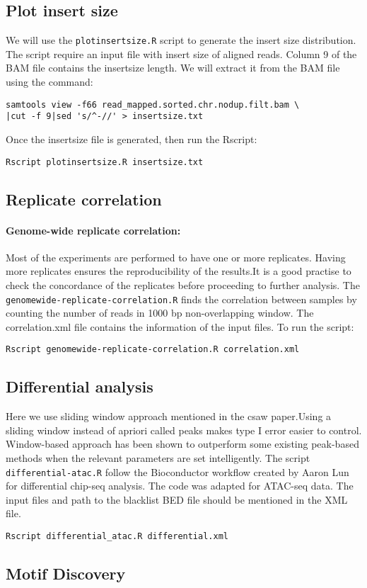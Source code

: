\documentclass[10pt]{article}
\newcommand{\prog}[1]{\texttt{#1}}
\begin{document}
\subsection{Plot insert size}
We will use the \prog{plotinsertsize.R} script to generate the insert size distribution. The script require an input file with insert size of aligned reads. Column 9 of the BAM file contains the insertsize length. We will extract it from the BAM file using the command:
\begin{verbatim}
samtools view -f66 read_mapped.sorted.chr.nodup.filt.bam \
|cut -f 9|sed 's/^-//' > insertsize.txt
\end{verbatim}
Once the insertsize file is generated, then run the Rscript:
\begin{verbatim}
Rscript plotinsertsize.R insertsize.txt
\end{verbatim}
\subsection{Replicate correlation}
\paragraph{Genome-wide replicate correlation:} Most of the experiments are performed to have one or more replicates. Having more replicates ensures the reproducibility of the results.It is a good practise to check the concordance of the replicates before proceeding to further analysis. The \prog{genomewide-replicate-correlation.R} finds the correlation between samples by counting the number of reads in 1000 bp non-overlapping window. The correlation.xml file contains the information of the input files. To run the script:
\begin{verbatim}
Rscript genomewide-replicate-correlation.R correlation.xml
\end{verbatim}
\subsection{Differential analysis}
Here we use sliding window approach mentioned in the csaw paper.Using a sliding window instead of apriori called peaks makes type I error easier to control. Window-based approach has been shown to outperform some existing peak-based methods when the relevant parameters are set intelligently. The script \prog{differential-atac.R} follow the  Bioconductor workflow created by Aaron Lun for differential chip-seq analysis. The code was adapted for ATAC-seq data. The input files and path to the blacklist BED file should be mentioned in the XML file.
\begin{verbatim}
Rscript differential_atac.R differential.xml
\end{verbatim}
\subsection{Motif Discovery}
\end{document}
